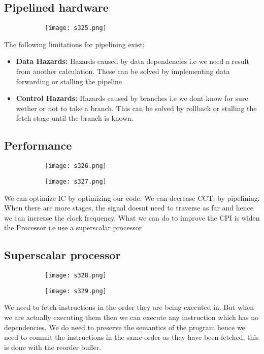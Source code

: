 \documentclass[8pt]{extreport}
\begin{document}
\subsection{Pipelined hardware}
\begin{figure}[H]
\begin{subfigure}[b]{0.4\linewidth}
\texttt{[image: s325.png]}
\end{subfigure}
\end{figure}
The following limitations for pipelining exist:
\begin{itemize}
\item \textbf{Data Hazards:} Hazards caused by data dependencies i.e we need a result from another calculation. These can be solved by implementing data forwarding or stalling the pipeline
\item \textbf{Control Hazards:} Hazards caused by branches i.e we dont know for sure wether or not to take a branch. This can be solved by rollback or stalling  the fetch stage until the branch is known.
\end{itemize}

\subsection{Performance}
\begin{figure}[H]
\begin{subfigure}[b]{0.4\linewidth}
\texttt{[image: s326.png]}
\end{subfigure}
\begin{subfigure}[b]{0.4\linewidth}
\texttt{[image: s327.png]}
\end{subfigure}
\end{figure}
We can optimize IC by optimizing our code. We can decrease CCT, by pipelining. When there are more stages, the signal doesnt need to traverse as far and hence we can increase the clock frequency. What we can do to improve the CPI is widen the Processor i.e use a superscalar processor

\subsection{Superscalar processor}
\begin{figure}[H]
\begin{subfigure}[b]{0.4\linewidth}
\texttt{[image: s328.png]}
\end{subfigure}
\begin{subfigure}[b]{0.4\linewidth}
\texttt{[image: s329.png]}
\end{subfigure}
\end{figure}
We need to fetch instructions in the order they are being executed in. But when we are actually executing them then we can execute any instruction which has no dependencies. We do need to preserve the semantics of the program hence we need to commit the instructions in the same order as they have been fetched, this is done with the reorder buffer.
\end{document}
